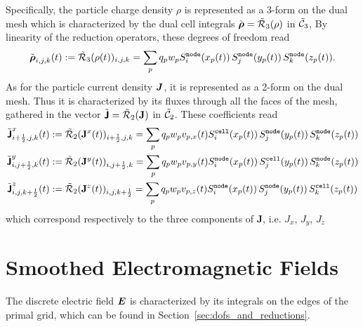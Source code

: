 \documentclass[11pt]{article}
\newcommand{\cell}{\texttt{cell}}
\newcommand{\node}{\texttt{node}}
\begin{document}
Specifically, the particle charge density $\rho$ is represented as a 3-form on the dual mesh which is 
characterized by the dual cell integrals $\tilde{{\boldsymbol {\rm \mathsf{\rho}}}} = \tilde{\mathcal{R}}_3(\rho)$ in $\tilde{ \mathcal{C}}_3$,
By linearity of the reduction operators, these degrees of freedom %
read
$$
\tilde{\arr{\rho}}_{i,j,k}(t) := \tcR_3(\rho(t))_{i,j,k}
= \sum_p q_p w_p S^\node_i(x_p(t))\, S^\node_j(y_p(t)) \,S^\node_k(z_p(t)).
$$
As for the particle current density ${\boldsymbol J}$, it is represented as a 2-form on the dual mesh. 
Thus it is characterized 
by its fluxes through all the faces of the mesh, gathered in the vector 
$\tilde{{\boldsymbol {\rm \mathsf{J}}}} = \tilde{\mathcal{R}}_2( \mathbf{J})$ in $\tilde{ \mathcal{C}}_2$. These coefficients read
$$
\begin{aligned}
\tilde{\arrJ}^{x}_{\iph,j,k}(t) &:= \tcR_2( \mathbf{J}^{x}(t))_{\iph,j,k} = \sum_p q_p w_p v_{p,x}(t) S^\cell_i(x_p(t))\, S^\node_j(y_p(t)) \,S^\node_k(z_p(t)) \\ 
\tilde{\arrJ}^{y}_{i,\jph,k}(t) &:= \tcR_2( \mathbf{J}^{y}(t))_{i,\jph,k} =\sum_p q_p w_p v_{p,y}(t) S^\node_i(x_p(t))\, S^\cell_j(y_p(t)) \,S^\node_k(z_p(t)) \\
\tilde{\arrJ}^{z}_{i,j,\kph}(t) &:= \tcR_2( \mathbf{J}^{z}(t))_{i,j,\kph} = \sum_p q_p w_p v_{p,z}(t) S^\node_i(x_p(t))\, S^\node_j(y_p(t)) \,S^\cell_k(z_p(t)) \\
\end{aligned}
$$
which correspond respectively to the three components of $\mathbf{J}$, i.e.  $J_x$, $J_y$, $J_z$ 

\section{Smoothed Electromagnetic Fields}\label{sec:SmoothedEFields}

The discrete electric field ${\boldsymbol E}$ is characterized by its integrals on the edges of the primal grid, which can be found 
in Section~\ref{sec:dofs_and_reductions}.
\end{document}
